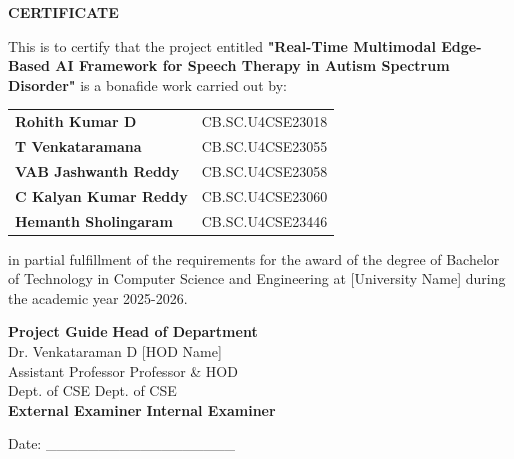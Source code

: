 \documentclass[12pt,a4paper]{article}
\begin{document}
\newpage
\thispagestyle{empty}
\begin{center}
\textbf{\Large CERTIFICATE}
\end{center}
\vspace{1cm}

This is to certify that the project entitled \textbf{"Real-Time Multimodal Edge-Based AI Framework for Speech Therapy in Autism Spectrum Disorder"} is a bonafide work carried out by:

\vspace{0.5cm}

\begin{center}
\begin{tabular}{ll}
\textbf{Rohith Kumar D} & CB.SC.U4CSE23018 \\
\textbf{T Venkataramana} & CB.SC.U4CSE23055 \\
\textbf{VAB Jashwanth Reddy} & CB.SC.U4CSE23058 \\
\textbf{C Kalyan Kumar Reddy} & CB.SC.U4CSE23060 \\
\textbf{Hemanth Sholingaram} & CB.SC.U4CSE23446 \\
\end{tabular}
\end{center}

\vspace{0.5cm}

in partial fulfillment of the requirements for the award of the degree of Bachelor of Technology in Computer Science and Engineering at [University Name] during the academic year 2025-2026.

\vspace{1.5cm}

\begin{flushleft}
\textbf{Project Guide} \hspace{8cm} \textbf{Head of Department} \\[0.3cm]
Dr. Venkataraman D \hspace{7.5cm} [HOD Name] \\
Assistant Professor \hspace{7.5cm} Professor \& HOD \\
Dept. of CSE \hspace{8.5cm} Dept. of CSE \\[2cm]

\textbf{External Examiner} \hspace{7cm} \textbf{Internal Examiner}
\end{flushleft}

\vspace{1cm}
\begin{center}
Date: \_\_\_\_\_\_\_\_\_\_\_\_\_\_\_\_\_\_
\end{center}
\end{document}
